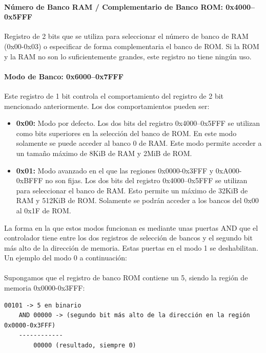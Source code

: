 \paragraph{Número de Banco RAM / Complementario de Banco ROM: 0x4000–0x5FFF} Registro de 2 bits que se utiliza para seleccionar el número de banco de RAM (0x00-0x03) o especificar de forma complementaria el banco de ROM. Si la ROM y la RAM no son lo suficientemente grandes, este registro no tiene ningún uso.

\paragraph{Modo de Banco: 0x6000–0x7FFF} Este registro de 1 bit controla el comportamiento del registro de 2 bit mencionado anteriormente. Los dos comportamientos pueden ser:

\begin{itemize}
    \item \textbf{0x00:} Modo por defecto. Los dos bits del registro 0x4000–0x5FFF se utilizan como bits superiores en la selección del banco de ROM. En este modo solamente se puede acceder al banco 0 de RAM. Este modo permite acceder a un tamaño máximo de 8KiB de RAM y 2MiB de ROM.
    \item \textbf{0x01:} Modo avanzado en el que las regiones 0x0000-0x3FFF y 0xA000-0xBFFF no son fijas. Los dos bits del registro 0x4000–0x5FFF se utilizan para seleccionar el banco de RAM. Esto permite un máximo de 32KiB de RAM y 512KiB de ROM. Solamente se podrán acceder a los bancos del 0x00 al 0x1F de ROM.
\end{itemize}

La forma en la que estos modos funcionan es mediante unas puertas AND que el controlador tiene entre los dos registros de selección de bancos y el segundo bit más alto de la dirección de memoria. Estas puertas en el modo 1 se deshabilitan. Un ejemplo del modo 0 a continuación:
\\\\
Supongamos que el registro de banco ROM contiene un 5, siendo la región de memoria 0x0000-0x3FFF:

\begin{lstlisting}[language=Consola, caption={Selección del banco de ROM en modo 0.}, label={code:bigromselectbankmode0}]
        00101 -> 5 en binario
    AND 00000 -> (segundo bit más alto de la dirección en la región 0x0000-0x3FFF)
    ------------
        00000 (resultado, siempre 0)
\end{lstlisting}


